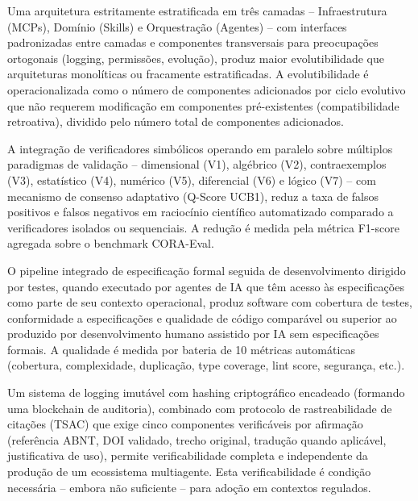 \documentclass[12pt,a4paper,sumario=tradicional,openany]{abntex2}
\begin{document}
\begin{description}[style=nextline,leftmargin=2cm,font=\normalfont]
    \item[H1 -- Hipótese da Arquitetura em Camadas:] Uma arquitetura estritamente estratificada em três camadas -- Infraestrutura (MCPs), Domínio (Skills) e Orquestração (Agentes) -- com interfaces padronizadas entre camadas e componentes transversais para preocupações ortogonais (logging, permissões, evolução), produz maior evolutibilidade que arquiteturas monolíticas ou fracamente estratificadas. A evolutibilidade é operacionalizada como o número de componentes adicionados por ciclo evolutivo que não requerem modificação em componentes pré-existentes (compatibilidade retroativa), dividido pelo número total de componentes adicionados.
    
    \item[H2 -- Hipótese da Verificação Multi-Paradigma:] A integração de verificadores simbólicos operando em paralelo sobre múltiplos paradigmas de validação -- dimensional (V1), algébrico (V2), contraexemplos (V3), estatístico (V4), numérico (V5), diferencial (V6) e lógico (V7) -- com mecanismo de consenso adaptativo (Q-Score UCB1), reduz a taxa de falsos positivos e falsos negativos em raciocínio científico automatizado comparado a verificadores isolados ou sequenciais. A redução é medida pela métrica F1-score agregada sobre o benchmark CORA-Eval.
    
    \item[H3 -- Hipótese do Pipeline SDD+TDD:] O pipeline integrado de especificação formal seguida de desenvolvimento dirigido por testes, quando executado por agentes de IA que têm acesso às especificações como parte de seu contexto operacional, produz software com cobertura de testes, conformidade a especificações e qualidade de código comparável ou superior ao produzido por desenvolvimento humano assistido por IA sem especificações formais. A qualidade é medida por bateria de 10 métricas automáticas (cobertura, complexidade, duplicação, type coverage, lint score, segurança, etc.).
    
    \item[H4 -- Hipótese da Auditabilidade Caixa Branca:] Um sistema de logging imutável com hashing criptográfico encadeado (formando uma blockchain de auditoria), combinado com protocolo de rastreabilidade de citações (TSAC) que exige cinco componentes verificáveis por afirmação (referência ABNT, DOI validado, trecho original, tradução quando aplicável, justificativa de uso), permite verificabilidade completa e independente da produção de um ecossistema multiagente. Esta verificabilidade é condição necessária -- embora não suficiente -- para adoção em contextos regulados.
\end{description}
\end{document}
